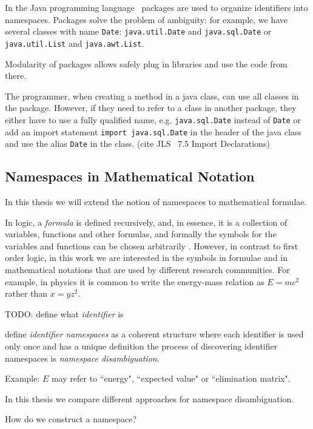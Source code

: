 In the Java programming language~\cite{gosling2014java} packages are used to organize identifiers 
into namespaces. 
Packages solve the problem of ambiguity: for example, we have several classes with 
name \texttt{Date}: \texttt{java.util.Date} and  \texttt{java.sql.Date} or 
\texttt{java.util.List} and \texttt{java.awt.List}.

Modularity of packages allows safely plug in libraries and use the code from there.


The programmer, when creating a method in a java class, can use all classes in the package. 
However, if they need to refer to a class in another package, they either have 
to use a fully qualified name, e.g. \texttt{java.sql.Date} instead of \texttt{Date}
or add an import statement \texttt{import java.sql.Date} in the header of the java 
class and use the alias  \texttt{Date} in the class.  (cite JLS~\cite{gosling2014java} 7.5 Import Declarations)




\subsection{Namespaces in Mathematical Notation}

In this thesis we will extend the notion of namespaces to mathematical formulae.

In logic, a \emph{formula} is defined recursively, and, in essence,
it is a collection of variables, functions and other formulas, and formally the symbols for
the variables and functions can be chosen arbitrarily \cite{barwise2000language}.
However, in contrast to first order logic, in this work we are interested in the symbols
in formulae and in mathematical notations that are used by different research communities.
For example, in physics it is common to write the energy-mass relation as $E=mc^2$ rather
than $x=yz^2$.

TODO: define what \emph{identifier} is


define \emph{identifier namespaces} as a coherent structure where each identifier is used only once and has a unique definition
the process of discovering identifier namespaces is \emph{namespace disambiguation}.


Example:
$E$ may refer to ``energy", ``expected value" or ``elimination matrix".

In this thesis we compare different approaches for namespace disambiguation.

How do we construct a namespace? 

